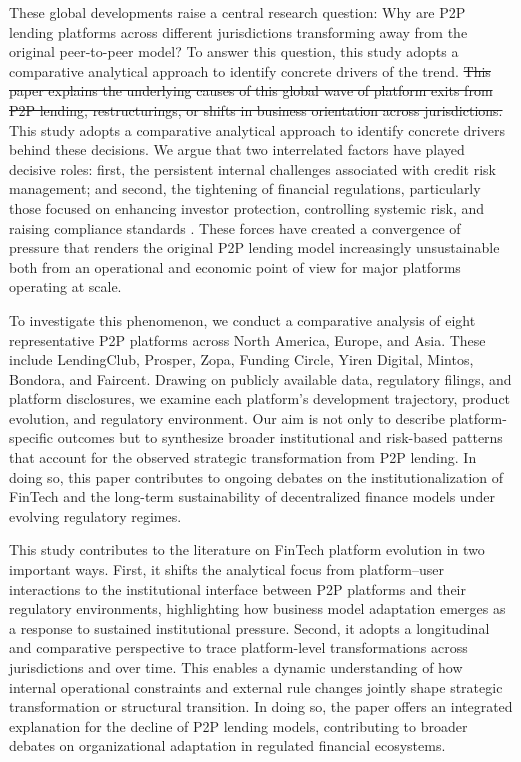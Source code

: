 \documentclass[pdflatex,sn-apa]{sn-jnl}%
\theoremstyle{thmstyleone}%
\theoremstyle{thmstyletwo}%
\theoremstyle{thmstylethree}%
\begin{document}
\textcolor{NavyBlue}{These global developments raise a central research question: Why are P2P lending platforms across different jurisdictions transforming away from the original peer-to-peer model? To answer this question, this study adopts a comparative analytical approach to identify concrete drivers of the trend.} \sout{This paper explains the underlying causes of this global wave of platform exits from P2P lending, restructurings, or shifts in business orientation across jurisdictions.} This study adopts a comparative analytical approach to identify concrete drivers behind these decisions. We argue that two interrelated factors have played decisive roles: first, the persistent internal challenges associated with credit risk management; and second, the tightening of financial regulations, particularly those focused on enhancing investor protection, controlling systemic risk, and raising compliance standards \citep{ma_can_2022,shen_empirical_2021}. These forces have created a convergence of pressure that renders the original P2P lending model increasingly unsustainable both from an operational and economic point of view for major platforms operating at scale.

To investigate this phenomenon, we conduct a comparative analysis of eight representative P2P platforms across North America, Europe, and Asia. These include LendingClub, Prosper, Zopa, Funding Circle, Yiren Digital, Mintos, Bondora, and Faircent. Drawing on publicly available data, regulatory filings, and platform disclosures, we examine each platform's development trajectory, product evolution, and regulatory environment. Our aim is not only to describe platform-specific outcomes but to synthesize broader institutional and risk-based patterns that account for the observed strategic transformation from P2P lending. In doing so, this paper contributes to ongoing debates on the institutionalization of FinTech and the long-term sustainability of decentralized finance models under evolving regulatory regimes.

\textcolor{NavyBlue}{This study contributes to the literature on FinTech platform evolution in two important ways. First, it shifts the analytical focus from platform–user interactions to the institutional interface between P2P platforms and their regulatory environments, highlighting how business model adaptation emerges as a response to sustained institutional pressure. Second, it adopts a longitudinal and comparative perspective to trace platform-level transformations across jurisdictions and over time. This enables a dynamic understanding of how internal operational constraints and external rule changes jointly shape strategic transformation or structural transition. In doing so, the paper offers an integrated explanation for the decline of P2P lending models, contributing to broader debates on organizational adaptation in regulated financial ecosystems.}
\end{document}
